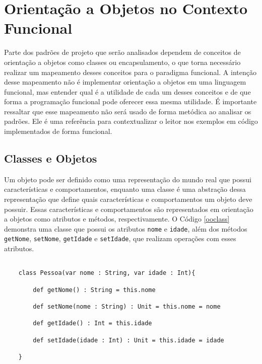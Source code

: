 
\chapter{Orientação a Objetos no Contexto Funcional}


Parte dos padrões de projeto que serão 
analisados dependem de conceitos 
de orientação a objetos como classes ou 
encapsulamento, o que torna necessário 
realizar um mapeamento desses conceitos 
para o paradigma funcional. A intenção 
desse mapeamento não é implementar 
orientação a objetos em uma linguagem 
funcional, mas entender qual é a utilidade 
de cada um desses conceitos e de que 
forma a programação funcional pode 
oferecer essa mesma utilidade. É importante 
ressaltar que esse mapeamento não será usado 
de forma metódica ao analisar os padrões. 
Ele é uma referência para contextualizar 
o leitor nos exemplos em código 
implementados de forma funcional. 


\section{Classes e Objetos}

Um objeto pode ser definido como uma representação 
do mundo real que possui características e comportamentos, 
enquanto uma classe é uma abstração dessa representação 
que define quais características e comportamentos um objeto 
deve possuir\cite{umlsystems}. Essas características 
e comportamentos são representados em orientação a 
objetos como atributos e métodos, respectivamente. 
O Código \ref{ooclass} demonstra uma classe que 
possui os atributos \texttt{nome} e \texttt{idade}, além dos métodos 
\texttt{getNome}, \texttt{setNome}, \texttt{getIdade} 
e \texttt{setIdade}, que realizam 
operações com esses atributos.

\begin{lstlisting}[caption={Exemplo de classe em Orientação a Objetos.},label=ooclass]
    
    class Pessoa(var nome : String, var idade : Int){

        def getNome() : String = this.nome

        def setNome(nome : String) : Unit = this.nome = nome

        def getIdade() : Int = this.idade

        def setIdade(idade : Int) : Unit = this.idade = idade

    }   

\end{lstlisting}

